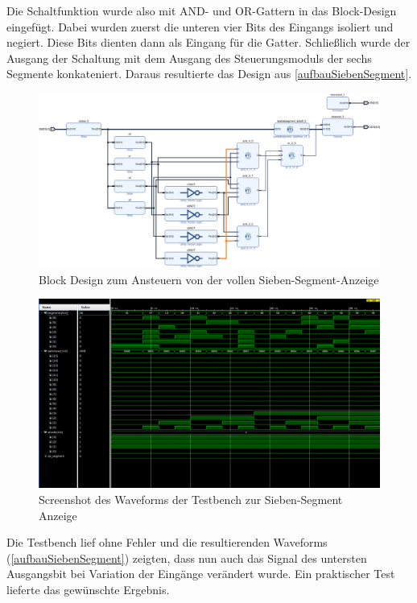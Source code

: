 \documentclass[11pt, a4paper]{article}
\begin{document}
Die Schaltfunktion wurde also mit AND- und OR-Gattern in das Block-Design eingefügt.
Dabei wurden zuerst die unteren vier Bits des Eingangs isoliert und negiert. Diese Bits dienten dann als Eingang für die Gatter. Schließlich wurde der Ausgang der Schaltung mit dem Ausgang des Steuerungsmoduls der sechs Segmente konkateniert.
Daraus resultierte das Design aus \autoref{aufbauSiebenSegment}.
\begin{figure}[htb]    
    \centering
    \includegraphics[width=\linewidth]{versuch2Data/seven_segment_display.pdf}
    \caption{Block Design zum Ansteuern von der vollen Sieben-Segment-Anzeige}
    \label{aufbauSiebenSegment}        
\end{figure}
\begin{figure}[htb]    
    \centering
    \includegraphics[width=\linewidth]{versuch2Data/aufgabe2.png}
    \caption{Screenshot des Waveforms der Testbench zur Sieben-Segment Anzeige}
    \label{waveformSiebenSegment}        
\end{figure}
Die Testbench lief ohne Fehler und die resultierenden Waveforms (\autoref{aufbauSiebenSegment}) zeigten, dass nun auch das Signal des untersten Ausgangsbit bei Variation der Eingänge verändert wurde. Ein praktischer Test lieferte das gewünschte Ergebnis.
\end{document}
